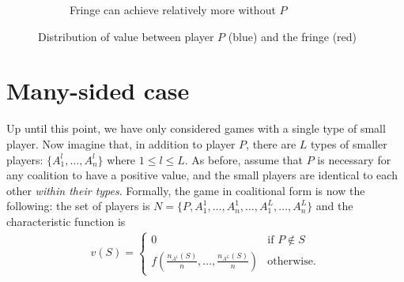 \documentclass[a4paper]{article}
\begin{document}
\begin{figure}
\begin{subfigure}[b]{0.45\textwidth}
        \caption{Fringe can achieve relatively more without $P$}
    \end{subfigure}
    \caption{Distribution of value between player $P$ (blue) and the fringe (red)}
    \label{fig:non_indispensable}
\end{figure}


\section{Many-sided case}
\label{sec:many_sided}

Up until this point, we have only considered games with a single type of small player.
Now imagine that, in addition to player $P$, there are $L$ types of smaller players: $\{A^l_1, \dots, A^l_n\}$ where $1 \leq l \leq L$.
As before, assume that $P$ is necessary for any coalition to have a positive value, and the small players are identical to each other \emph{within their types}.
Formally, the game in coalitional form is now the following: the set of players is $N = \{P, A^1_1, \dots, A^1_n, \dots, A^L_1, \dots, A^L_n\}$ and the characteristic function is
\begin{align*}
    v(S) = \begin{cases}
        0                                                & \text{if } P \notin S \\
        f\left(\frac{n_{A^1}(S)}{n}, \dots, \frac{n_{A^L}(S)}{n}\right) & \text{otherwise}.
    \end{cases}
\end{align*}
\end{document}

